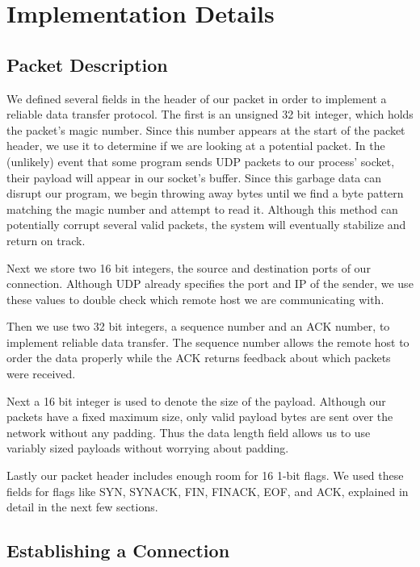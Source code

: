 \documentclass[12pt]{article}
\begin{document}
\maketitle

\section{Implementation Details}
\subsection{Packet Description}

We defined several fields in the header of our packet in order to implement a reliable data transfer protocol. The first is an unsigned 32 bit integer, which holds the packet's magic number. Since this number appears at the start of the packet header, we use it to determine if we are looking at a potential packet. In the (unlikely) event that some program sends UDP packets to our process' socket, their payload will appear in our socket's buffer. Since this garbage data can disrupt our program, we begin throwing away bytes until we find a byte pattern matching the magic number and attempt to read it. Although this method can potentially corrupt several valid packets, the system will eventually stabilize and return on track.

Next we store two 16 bit integers, the source and destination ports of our connection. Although UDP already specifies the port and IP of the sender, we use these values to double check which remote host we are communicating with.

Then we use two 32 bit integers, a sequence number and an ACK number, to implement reliable data transfer. The sequence number allows the remote host to order the data properly while the ACK returns feedback about which packets were received.

Next a 16 bit integer is used to denote the size of the payload. Although our packets have a fixed maximum size, only valid payload bytes are sent over the network without any padding. Thus the data length field allows us to use variably sized payloads without worrying about padding.

Lastly our packet header includes enough room for 16 1-bit flags. We used these fields for flags like SYN, SYNACK, FIN, FINACK, EOF, and ACK, explained in detail in the next few sections.

\subsection{Establishing a Connection}
\end{document}
